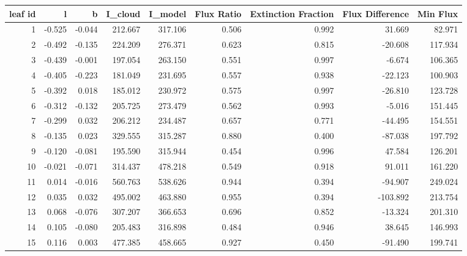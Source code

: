\begin{tabular}{rrrrrrrrr}
\toprule
 leaf id &      l &      b &  I\_cloud &  I\_model &  Flux Ratio &  Extinction Fraction &  Flux Difference &  Min Flux \\
\midrule
       1 & -0.525 & -0.044 &  212.667 &  317.106 &       0.506 &                0.992 &           31.669 &    82.971 \\
       2 & -0.492 & -0.135 &  224.209 &  276.371 &       0.623 &                0.815 &          -20.608 &   117.934 \\
       3 & -0.439 & -0.001 &  197.054 &  263.150 &       0.551 &                0.997 &           -6.674 &   106.365 \\
       4 & -0.405 & -0.223 &  181.049 &  231.695 &       0.557 &                0.938 &          -22.123 &   100.903 \\
       5 & -0.392 &  0.018 &  185.012 &  230.972 &       0.575 &                0.997 &          -26.810 &   123.728 \\
       6 & -0.312 & -0.132 &  205.725 &  273.479 &       0.562 &                0.993 &           -5.016 &   151.445 \\
       7 & -0.299 &  0.032 &  206.212 &  234.487 &       0.657 &                0.771 &          -44.495 &   154.551 \\
       8 & -0.135 &  0.023 &  329.555 &  315.287 &       0.880 &                0.400 &          -87.038 &   197.792 \\
       9 & -0.120 & -0.081 &  195.590 &  315.944 &       0.454 &                0.996 &           47.584 &   126.201 \\
      10 & -0.021 & -0.071 &  314.437 &  478.218 &       0.549 &                0.918 &           91.011 &   161.220 \\
      11 &  0.014 & -0.016 &  560.763 &  538.626 &       0.944 &                0.394 &          -94.907 &   249.024 \\
      12 &  0.035 &  0.032 &  495.002 &  463.880 &       0.955 &                0.394 &         -103.892 &   213.754 \\
      13 &  0.068 & -0.076 &  307.207 &  366.653 &       0.696 &                0.852 &          -13.324 &   201.310 \\
      14 &  0.105 & -0.080 &  205.483 &  316.898 &       0.484 &                0.946 &           38.645 &   146.993 \\
      15 &  0.116 &  0.003 &  477.385 &  458.665 &       0.927 &                0.450 &          -91.490 &   199.741 \\

\end{tabular}
